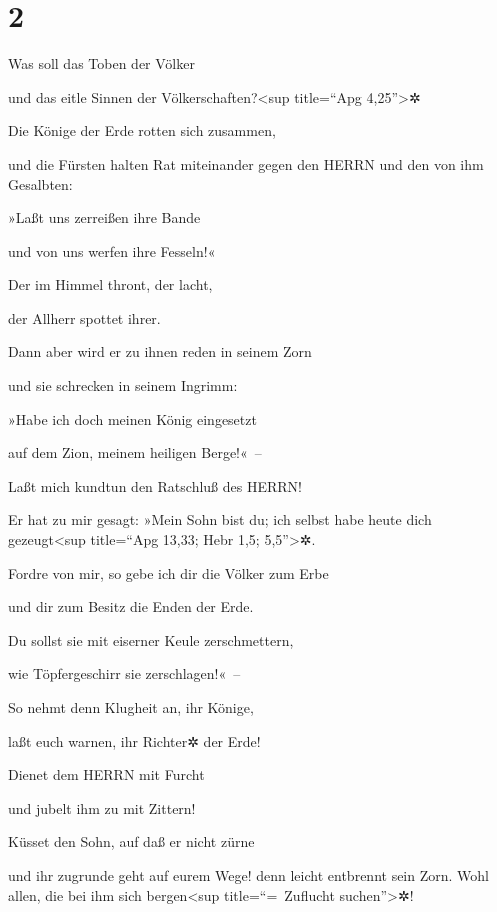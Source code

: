 \hypertarget{section-1}{%
\section{2}\label{section-1}}

Was soll das Toben der Völker

und das eitle Sinnen der Völkerschaften?\textless sup title=``Apg
4,25''\textgreater✲

Die Könige der Erde rotten sich zusammen,

und die Fürsten halten Rat miteinander gegen den HERRN und den von ihm
Gesalbten:

»Laßt uns zerreißen ihre Bande

und von uns werfen ihre Fesseln!«

Der im Himmel thront, der lacht,

der Allherr spottet ihrer.

Dann aber wird er zu ihnen reden in seinem Zorn

und sie schrecken in seinem Ingrimm:

»Habe ich doch meinen König eingesetzt

auf dem Zion, meinem heiligen Berge!«~--

Laßt mich kundtun den Ratschluß des HERRN!

Er hat zu mir gesagt: »Mein Sohn bist du; ich selbst habe heute dich
gezeugt\textless sup title=``Apg 13,33; Hebr 1,5; 5,5''\textgreater✲.

Fordre von mir, so gebe ich dir die Völker zum Erbe

und dir zum Besitz die Enden der Erde.

Du sollst sie mit eiserner Keule zerschmettern,

wie Töpfergeschirr sie zerschlagen!«~--

So nehmt denn Klugheit an, ihr Könige,

laßt euch warnen, ihr Richter✲ der Erde!

Dienet dem HERRN mit Furcht

und jubelt ihm zu mit Zittern!

Küsset den Sohn, auf daß er nicht zürne

und ihr zugrunde geht auf eurem Wege! denn leicht entbrennt sein Zorn.
Wohl allen, die bei ihm sich bergen\textless sup title=``=~Zuflucht
suchen''\textgreater✲!

